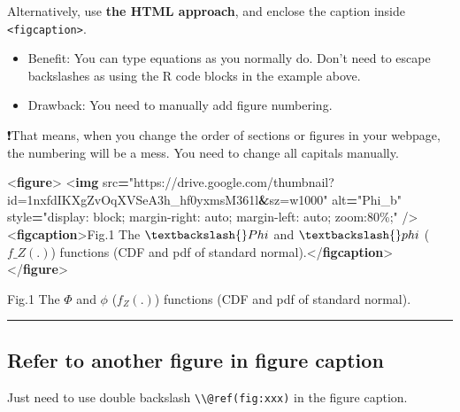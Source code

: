 \documentclass[
  a4paper,
  twoside,
  openright]{book}
\newenvironment{Shaded}{\begin{snugshade}}{\end{snugshade}}
\newcommand{\DataTypeTok}[1]{\textcolor[rgb]{0.13,0.29,0.53}{#1}}
\newcommand{\ErrorTok}[1]{\textcolor[rgb]{0.64,0.00,0.00}{\textbf{#1}}}
\newcommand{\KeywordTok}[1]{\textcolor[rgb]{0.13,0.29,0.53}{\textbf{#1}}}
\newcommand{\NormalTok}[1]{#1}
\newcommand{\OperatorTok}[1]{\textcolor[rgb]{0.81,0.36,0.00}{\textbf{#1}}}
\newcommand{\OtherTok}[1]{\textcolor[rgb]{0.56,0.35,0.01}{#1}}
\newcommand{\StringTok}[1]{\textcolor[rgb]{0.31,0.60,0.02}{#1}}
\providecommand{\tightlist}{%
  \setlength{\itemsep}{0pt}\setlength{\parskip}{0pt}}
\theoremstyle{definition}
\theoremstyle{definition}
\theoremstyle{definition}
\theoremstyle{definition}
\theoremstyle{remark}
\begin{document}
Alternatively, use \textbf{the HTML approach}, and enclose the caption inside \texttt{\textless{}figcaption\textgreater{}}.

\begin{itemize}
\tightlist
\item
  Benefit: You can type equations as you normally do. Don't need to escape backslashes as using the R code blocks in the example above.
\item
  {Drawback: You need to manually add figure numbering.}
\end{itemize}

❗️That means, when you change the order of sections or figures in your webpage, the numbering will be a mess. You need to change all capitals manually.

\begin{Shaded}
\begin{Highlighting}[]
\DataTypeTok{\textless{}}\KeywordTok{figure}\DataTypeTok{\textgreater{}} 
\DataTypeTok{\textless{}}\KeywordTok{img}\OtherTok{ src}\OperatorTok{=}\StringTok{"https://drive.google.com/thumbnail?id=1nxfdIKXgZvOqXVSeA3h\_hf0yxmsM361l}\ErrorTok{\&}\StringTok{sz=w1000"}\OtherTok{ alt}\OperatorTok{=}\StringTok{"Phi\_b"}\OtherTok{ style}\OperatorTok{=}\StringTok{"display: block; margin{-}right: auto; margin{-}left: auto; zoom:80\%;"}\OtherTok{ }\DataTypeTok{/\textgreater{}}
\DataTypeTok{\textless{}}\KeywordTok{figcaption}\DataTypeTok{\textgreater{}}\NormalTok{Fig.1 The $\textbackslash{}Phi$ and $\textbackslash{}phi$ ($f\_Z(.)$) functions (CDF and pdf of standard normal).}\DataTypeTok{\textless{}/}\KeywordTok{figcaption}\DataTypeTok{\textgreater{}}
\DataTypeTok{\textless{}/}\KeywordTok{figure}\DataTypeTok{\textgreater{}}
\end{Highlighting}
\end{Shaded}

Fig.1 The \(\Phi\) and \(\phi\) (\(f_Z(.)\)) functions (CDF and pdf of standard normal).

\begin{center}\rule{0.5\linewidth}{0.5pt}\end{center}

\subsection*{Refer to another figure in figure caption}\label{refer-to-another-figure-in-figure-caption}

Just need to use double backslash \texttt{\textbackslash{}\textbackslash{}@ref(fig:xxx)} in the figure caption.
\end{document}
